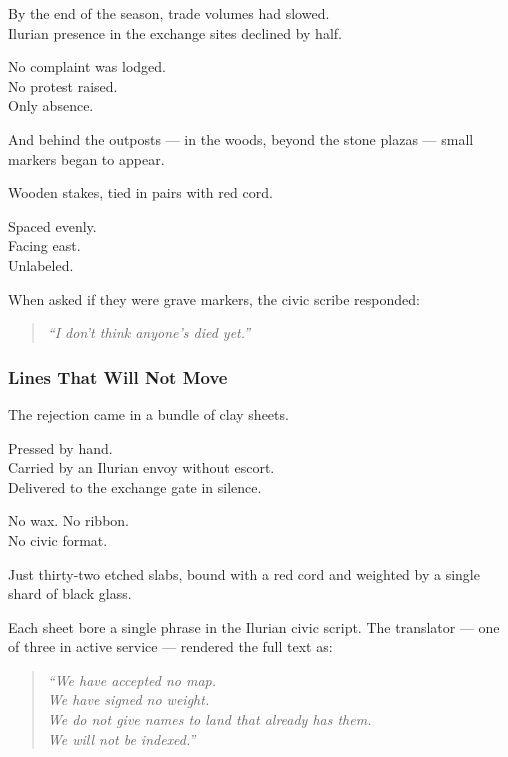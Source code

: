 \documentclass[12pt]{article}
\begin{document}
By the end of the season, trade volumes had slowed.\\
Ilurian presence in the exchange sites declined by half.

No complaint was lodged.\\
No protest raised.\\
Only absence.

And behind the outposts — in the woods, beyond the stone plazas — small markers began to appear.

Wooden stakes, tied in pairs with red cord.

Spaced evenly.\\
Facing east.\\
Unlabeled.

When asked if they were grave markers, the civic scribe responded:

\begin{quote}
\textit{“I don’t think anyone’s died yet.”}
\end{quote}

\dotfill

\subsubsection*{Lines That Will Not Move}

The rejection came in a bundle of clay sheets.

Pressed by hand.\\
Carried by an Ilurian envoy without escort.\\
Delivered to the exchange gate in silence.

No wax. No ribbon.\\
No civic format.

Just thirty-two etched slabs, bound with a red cord and weighted by a single shard of black glass.

Each sheet bore a single phrase in the Ilurian civic script. The translator --- one of three in active service --- rendered the full text as:

\begin{quote}
\textit{“We have accepted no map.}\\
\textit{We have signed no weight.}\\
\textit{We do not give names to land that already has them.}\\
\textit{We will not be indexed.”}
\end{quote}

\vspace{1em}
\end{document}
